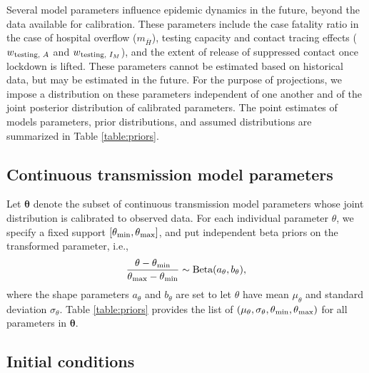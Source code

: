 \documentclass[11pt]{article}
\newcommand{\btheta}{\boldsymbol{\theta}}
\begin{document}
Several model parameters influence epidemic dynamics in the future, beyond the data available for calibration. These parameters include the case fatality ratio in the case of hospital overflow ($m_{\bar{H}}$), testing capacity and contact tracing effects ($w\textsubscript{testing, $A$}$ and $w\textsubscript{testing, $I_M$}$), and the extent of release of suppressed contact once lockdown is lifted. These parameters cannot be estimated based on historical data, but may be estimated in the future. For the purpose of projections, we impose a distribution on these parameters independent of one another and of the joint posterior distribution of calibrated parameters.  The point estimates of models parameters, prior distributions, and assumed distributions are summarized in Table \ref{table:priors}.


\subsection{Continuous transmission model parameters} 

Let $\btheta$ denote the subset of continuous transmission model parameters whose joint distribution is calibrated to observed data. For each individual parameter $\theta$, we specify a fixed support $[\theta\textsubscript{min}, \theta\textsubscript{max}]$, and put independent beta priors on the transformed parameter, i.e.,
\begin{equation}
\frac{\theta - \theta\textsubscript{min}}{\theta\textsubscript{max} - \theta\textsubscript{min}} \sim \mbox{Beta}(a_{\theta}, b_{\theta}),
\label{eq:truncdist}
\end{equation}    
where the shape parameters $a_{\theta}$ and $b_\theta$ are set to let $\theta$ have mean $\mu_\theta$ and standard deviation $\sigma_\theta$. Table \ref{table:priors} provides the list of $(\mu_\theta, \sigma_\theta, \theta\textsubscript{min}, \theta\textsubscript{max})$ for all parameters in $\btheta$. 


\subsection{Initial conditions}
\end{document}
